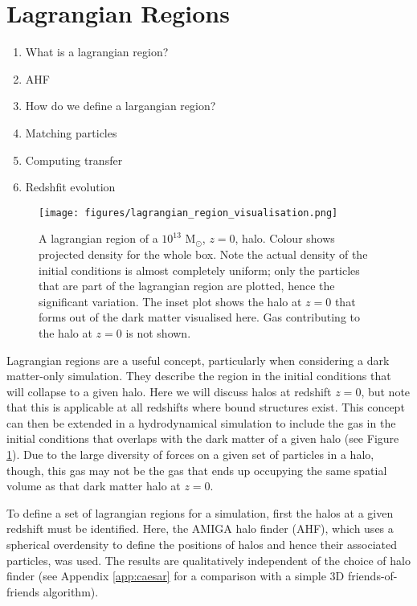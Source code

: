 \section{Lagrangian Regions}

\begin{enumerate}
    \item What is a lagrangian region?
    \item AHF
    \item How do we define a largangian region?
    \item Matching particles
    \item Computing transfer
    \item Redshfit evolution
\end{enumerate}

\begin{figure}
    \centering
    \texttt{[image: figures/lagrangian\_region\_visualisation.png]}
    \caption{A lagrangian region of a $10^{13}$ $\mathrm{M}_\odot$, $z=0$, halo. Colour shows projected density for the whole box. Note the actual density of the initial conditions is almost completely uniform; only the particles that are part of the lagrangian region are plotted, hence the significant variation. The inset plot shows the halo at $z=0$ that forms out of the dark matter visualised here. Gas contributing to the halo at $z=0$ is not shown.}
    \label{fig:lrpic}
\end{figure}

Lagrangian regions are a useful concept, particularly when considering a dark matter-only simulation. They describe the region in the initial conditions that will collapse to a given halo. Here we will discuss halos at redshift $z=0$, but note that this is applicable at all redshifts where bound structures exist. This concept can then be extended in a hydrodynamical simulation to include the gas in the initial conditions that overlaps with the dark matter of a given halo (see Figure \ref{fig:lrpic}). Due to the large diversity of forces on a given set of particles in a halo, though, this gas may not be the gas that ends up occupying the same spatial volume as that dark matter halo at $z=0$.

To define a set of lagrangian regions for a simulation, first the halos at a given redshift must be identified. Here, the AMIGA halo finder (AHF), which uses a spherical overdensity to define the positions of halos and hence their associated particles, was used. The results are qualitatively independent of the choice of halo finder (see Appendix \ref{app:caesar} for a comparison with a simple 3D friends-of-friends algorithm).

